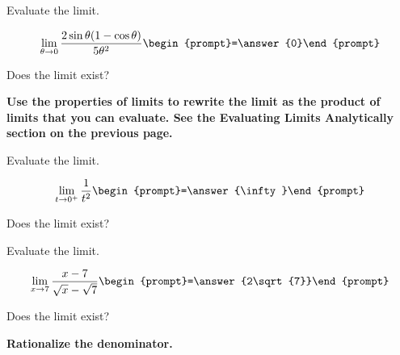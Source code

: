 \documentclass{ximera}
\begin{document}
\begin{problem}
Evaluate the limit.

\[ \lim_{\theta\to 0} \frac{2 \sin \theta (1-\cos \theta)}{5 \theta^2} \begin{prompt}=\answer{0}\end{prompt}\]


Does the limit exist?

\begin{multipleChoice}
  \end{multipleChoice}

\begin{hint}
\textbf{Use the properties of limits to rewrite the limit as the product of limits that you can evaluate.  See the 
Evaluating Limits Analytically section on the previous page.}
\end{hint}


\end{problem}

\begin{problem}
Evaluate the limit.

\[ \lim_{t\to 0^+} \frac{1}{t^2} \begin{prompt}=\answer{\infty}\end{prompt}\]


Does the limit exist?

\begin{multipleChoice}
  \end{multipleChoice}


\end{problem}


\begin{problem}
Evaluate the limit.

\[ \lim_{x\to 7} \frac{x-7}{\sqrt{x} - \sqrt{7}} \begin{prompt}=\answer{2\sqrt{7}}\end{prompt}\]


Does the limit exist?
\begin{multipleChoice}
  \end{multipleChoice}

\begin{hint}
\textbf{Rationalize the denominator.}
\end{hint}

\end{problem}
\end{document}
